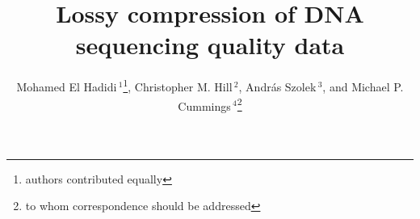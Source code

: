 \documentclass{bioinfo}
\begin{document}

\title[lossy-compression]{Lossy compression of DNA sequencing quality
  data} \author[El Hadidi \textit{et~al.}]{Mohamed El
  Hadidi\,$^{1}$\footnote{authors contributed equally}, Christopher
  M. Hill\,$^{2}$\footnotemark[1], Andr\'{a}s
  Szolek\,$^{3}$\footnotemark[1], and Michael
  P. Cummings\,$^4$\footnote{to whom correspondence should be
    addressed}} \address{$^{1}$Department of Algorithms in
  Bioinformatics, Center for Bioinformatics, University of
  T\"{u}bingen, Sand 14, 72076 T\"{u}bingen, Germany
  \\ $^{2}$Department of Computer Science, University of Maryland,
  College Park, Maryland, 20742 USA\\ $^{3}$Department of Applied
  Bioinformatics, Center for Bioinformatics, Quantitative Biology
  Center, and Department of Computer Science, University of
  T\"{u}bingen, Sand 14, 72076 T\"{u}bingen, Germany\\ $^{4}$Center
  for Bioinformatics and Computational Biology, University of
  Maryland, College Park, Maryland, 20742 USA}

\maketitle
\end{document}

